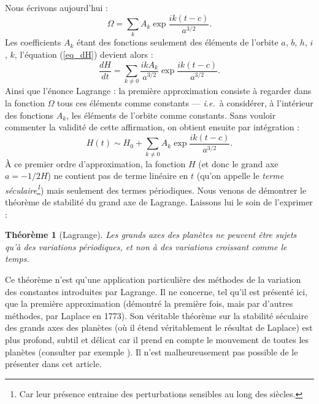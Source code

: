\documentclass[12pt,paperletter, reqno]{amsart}
\newcommand{\ie}{\textit{i.e.}}
\theoremstyle{plain}
\newtheorem{theoreme}{Théorème}
\theoremstyle{remark}
\begin{document}
  Nous écrivons aujourd'hui :
  \begin{equation}
    \Omega = \sum_k  A_k \exp \frac{i k(t-c)}{a^{3/2}}.
  \end{equation}
  Les coefficients $A_k$ étant des fonctions seulement des éléments de l'orbite $a$, $b$, $h$, $i$, $k$,
  l'équation (\ref{eq_dH}) devient alors :
  \begin{equation}
    \frac{dH}{dt} = \sum_{k\neq 0} \frac{ikA_k}{a^{3/2}} \exp \frac{i k(t-c)}{a^{3/2}}.
  \end{equation}
  Ainsi que l'énonce Lagrange :
  \og la première approximation consiste à regarder dans la fonction $\Omega$ tous ces éléments comme constants\fg{} \cite[page 736]{Lagrange2} --- \ie\ à considérer,
  à l'intérieur des fonctions $A_k$,
  les éléments de l'orbite comme constants.
  Sans vouloir commenter la validité de cette affirmation,
  on obtient ensuite par intégration :
  \begin{equation}
    H(t) \sim H_0 + \sum_{k\neq 0} A_k \exp\frac{i k(t-c)}{a^{3/2}}.
  \end{equation}
  À ce premier ordre d'approximation,
  la fonction $H$ (et donc le grand axe $a=-1/2H$) ne contient pas de terme linéaire en $t$ (qu'on appelle le \emph{terme séculaire\footnote{Car leur présence entraine des perturbations sensibles au long des siècles.}}) mais seulement des termes périodiques.
  Nous venons de démontrer le théorème de stabilité du grand axe de Lagrange.
  Laissons lui le soin de l'exprimer \cite[page 736]{Lagrange2} :
  
  \begin{theoreme}[Lagrange]
    Les grands axes des planètes ne peuvent être sujets qu'à des variations périodiques,
    et non à des variations croissant comme le temps.
  \end{theoreme}
  
  Ce théorème n'est qu'une application particulière des méthodes de la variation des constantes introduites par Lagrange.
  Il ne concerne,
  tel qu'il est présenté ici,
  que la première approximation (démontré la première fois, mais par d'autres méthodes, par Laplace en 1773).
  Son véritable théorème sur la stabilité séculaire des grands axes des planètes (où il étend véritablement le résultat de Laplace) est plus profond,
  subtil et délicat car il prend en compte le mouvement de toutes les planètes (consulter par exemple \cite{Sternberg1}).
  Il n'est malheureusement pas possible de le présenter dans cet article.
  
\end{document}
